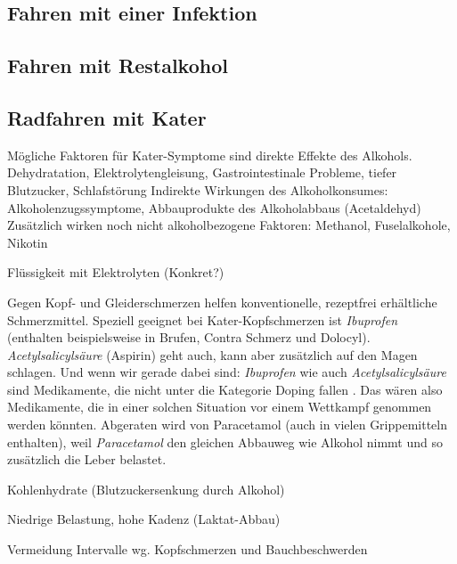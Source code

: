 \subsection{Fahren mit einer Infektion}

\subsection{Fahren mit Restalkohol}

\subsection{Radfahren mit Kater}
\cite{Hurford2015hangover}

Mögliche Faktoren für Kater-Symptome \cite{swift1998alcohol} sind direkte Effekte des Alkohols.
Dehydratation, Elektrolytengleisung, Gastrointestinale Probleme, tiefer Blutzucker, Schlafstörung
Indirekte Wirkungen des Alkoholkonsumes:
Alkoholenzugssymptome, Abbauprodukte des Alkoholabbaus (Acetaldehyd)
Zusätzlich wirken noch nicht alkoholbezogene Faktoren: Methanol, Fuselalkohole, Nikotin

Flüssigkeit mit Elektrolyten (Konkret?)

Gegen Kopf- und Gleiderschmerzen helfen konventionelle, rezeptfrei erhältliche Schmerzmittel.
Speziell geeignet bei Kater-Kopfschmerzen ist \textsl{Ibuprofen}
(enthalten beispielsweise in Brufen, Contra Schmerz und Dolocyl).
\textsl{Acetylsalicylsäure} (Aspirin) geht auch, kann aber zusätzlich auf den Magen schlagen.
Und wenn wir gerade dabei sind: \textsl{Ibuprofen} wie auch \textsl{Acetylsalicylsäure}
sind Medikamente, die nicht unter die Kategorie Doping fallen \cite{nada2014erlaubtemedikamente}.
Das wären also Medikamente, die in einer solchen Situation vor einem Wettkampf genommen werden könnten.
Abgeraten wird von Paracetamol (auch in vielen Grippemitteln enthalten),
weil \textsl{Paracetamol} den gleichen Abbauweg wie Alkohol nimmt und so zusätzlich die Leber belastet.

Kohlenhydrate (Blutzuckersenkung durch Alkohol)

Niedrige Belastung, hohe Kadenz (Laktat-Abbau)

Vermeidung Intervalle wg. Kopfschmerzen und Bauchbeschwerden

